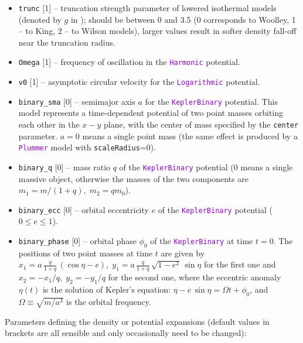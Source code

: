 \documentclass[12pt]{article}
\newcommand{\ttt}[1]{\textcolor{darkviolet}{\texttt{#1}}}
\newcommand{\ppp}[1]{\textcolor{darkolive} {\texttt{#1}}}
\begin{document}
\begin{itemize}
\item \ppp{trunc} [1] -- truncation strength parameter of lowered isothermal models (denoted by $g$ in \cite{GielesZocchi2015}); should be between 0 and 3.5 (0 corresponds to Woolley, 1 -- to King, 2 -- to Wilson models), larger values result in softer density fall-off near the truncation radius.
\item \ppp{Omega} [1] -- frequency of oscillation in the \ttt{Harmonic} potential.
\item \ppp{v0} [1] -- asymptotic circular velocity for the \ttt{Logarithmic} potential.
\item \ppp{binary_sma} [0] -- semimajor axis $a$ for the \ttt{KeplerBinary} potential. This model represents a time-dependent potential of two point masses orbiting each other in the $x-y$ plane, with the center of mass specified by the \ppp{center} parameter. $a=0$ means a single point mass (the same effect is produced by a \ttt{Plummer} model with \ppp{scaleRadius}=0).
\item \ppp{binary_q} [0] -- mass ratio $q$ of the \ttt{KeplerBinary} potential (0 means a single massive object, otherwise the masses of the two components are $m_1=m/(1+q),\; m_2=qm_0$).
\item \ppp{binary_ecc} [0] -- orbital eccentricity $e$ of the \ttt{KeplerBinary} potential ($0\le e \le 1$).
\item \ppp{binary_phase} [0] -- orbital phase $\phi_0$ of the \ttt{KeplerBinary} at time $t=0$. The positions of two point masses at time $t$ are given by $x_1 = a\,\frac{q}{1+q}\, (\cos\eta-e),\; y_1 = a\,\frac{q}{1+q}\,\sqrt{1-e^2}\,\sin\eta$ for the first one and $x_2=-x_1/q,\; y_2=-y_1/q$ for the second one, where the eccentric anomaly $\eta(t)$ is the solution of Kepler's equation: $\eta - e\,\sin\eta = \Omega t + \phi_0$, and $\Omega \equiv \sqrt{m/a^3}$ is the orbital frequency.
\end{itemize}
\label   {sec:PotentialExpansionParams}
Parameters defining the density or potential expansions (default values in brackets are all sensible and only occasionally need to be changed):
\end{document}
